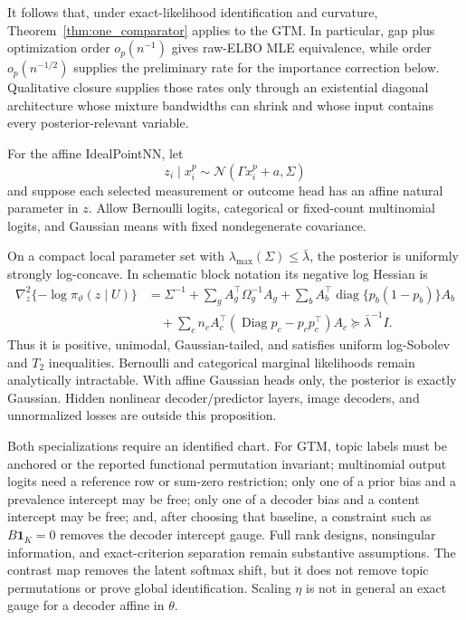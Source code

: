 It follows that, under exact-likelihood identification and curvature,
Theorem~\ref{thm:one_comparator} applies to the GTM.  In particular, gap plus
optimization order $o_p(n^{-1})$ gives raw-ELBO MLE equivalence, while order
$o_p(n^{-1/2})$ supplies the preliminary rate for the importance correction
below.  Qualitative closure supplies those rates only through an existential
diagonal architecture whose mixture bandwidths can shrink and whose input
contains every posterior-relevant variable.

For the affine IdealPointNN, let
\[
 z_i\mid x_i^p\sim\mathcal N(\Gamma x_i^p+a,\Sigma)
\]
and suppose each selected measurement or outcome head has an affine natural
parameter in $z$.  Allow Bernoulli logits, categorical or fixed-count
multinomial logits, and Gaussian means with fixed nondegenerate covariance.

\begin{proposition}
\label{prop:idealpoint_strong_logconcavity}
On a compact local parameter set with
$\lambda_{\max}(\Sigma)\leq\bar\lambda$, the posterior is uniformly strongly
log-concave.  In schematic block notation its negative log Hessian is
\begin{align}
 \nabla_z^2\{-\log\pi_\vartheta(z\mid U)\}
 &=\Sigma^{-1}
 +\sum_g A_g^\top\Omega_g^{-1}A_g
 +\sum_b A_b^\top\operatorname{diag}\{p_b(1-p_b)\}A_b\\
 &\quad+\sum_c n_c A_c^\top
   (\operatorname{Diag}p_c-p_cp_c^\top)A_c
 \succeq\bar\lambda^{-1}I.
 \label{eq:idealpoint_posterior_hessian}
\end{align}
Thus it is positive, unimodal, Gaussian-tailed, and satisfies uniform
log-Sobolev and $T_2$ inequalities.  Bernoulli and categorical marginal
likelihoods remain analytically intractable.  With affine Gaussian heads only,
the posterior is exactly Gaussian.  Hidden nonlinear decoder/predictor layers,
image decoders, and unnormalized losses are outside this proposition.
\end{proposition}

Both specializations require an identified chart.  For GTM, topic labels must
be anchored or the reported functional permutation invariant; multinomial
output logits need a reference row or sum-zero restriction; only one of a
prior bias and a prevalence intercept may be free; only one of a decoder bias
and a content intercept may be free; and, after choosing that baseline, a
constraint such as $B\mathbf1_K=0$ removes the decoder intercept gauge.  Full
rank designs, nonsingular information, and exact-criterion separation remain
substantive assumptions.  The contrast map removes the latent softmax shift,
but it does not remove topic permutations or prove global identification.
Scaling $\eta$ is not in general an exact gauge for a decoder affine in
$\theta$.

